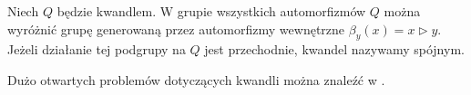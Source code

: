 \begin{definition}
%
    Niech $Q$ będzie kwandlem.
    W grupie wszystkich automorfizmów $Q$ można wyróżnić grupę generowaną przez automorfizmy wewnętrzne $\beta_y(x) = x \triangleright y$.
    Jeżeli działanie tej podgrupy na $Q$ jest przechodnie, kwandel nazywamy spójnym.
\end{definition}

Dużo otwartych problemów dotyczących kwandli można znaleźć w \cite[s. 455-465]{ohtsuki02}.



